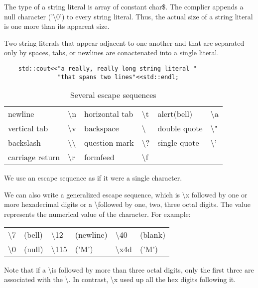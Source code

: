 \documentclass[UTF8]{ctexart}
\begin{document}
The type of a string literal is array of constant char\$. The complier appends a null character ('\textbackslash 0') to every string literal. Thus, the actual size of a string literal is one more than its apparent size. 

Two string literals that appear adjacent to one another and that are separated only by spaces, tabs, or newlines are conactenated into a single literal.
\begin{lstlisting}
	std::cout<<"a really, really long string literal "
			   "that spans two lines"<<std::endl;
\end{lstlisting}

\begin{table}[H]
	\centering
	\begin{tabular}{|l|l|l|l|l|l|}
		\hline
		newline & \textbackslash n & horizontal tab & \textbackslash t & alert(bell) & \textbackslash a \\
		vertical tab & \textbackslash v  & backspace &  \textbackslash & double quote &  \textbackslash " \\
		backslash &  \textbackslash  \textbackslash & question mark &  \textbackslash ? & single quote &  \textbackslash ' \\
		carriage return &  \textbackslash r & formfeed &  \textbackslash f & & \\
		\hline		
	\end{tabular}%
	\caption*{Several escape sequences}
\end{table}

We use an escape sequence as if it were a single character.

We can also write a generalized escape sequence, which is  \textbackslash x followed by one or more hexadecimal digits or a  \textbackslash followed by one, two, three octal digits. The value represents the numerical value of the character. For example:

\begin{table}[H]
	\centering
	\begin{tabular}{|l|l|l|l|l|l|}
		\hline
		\textbackslash 7 & (bell) &  \textbackslash 12 & (newline) &  \textbackslash 40 & (blank) \\
		\textbackslash 0 & (null) &  \textbackslash 115 & ('M') &  \textbackslash x4d & ('M') \\
		\hline
	\end{tabular}%
\end{table}

Note that if a  \textbackslash is followed by more than three octal digits, only the first three are associated with the  \textbackslash. In contrast,  \textbackslash x used up all the hex digits following it.
\end{document}
